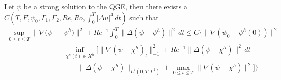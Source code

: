 \begin{thm} \label{thm:StrongConvergence}
  Let $\psi$ be a strong solution to the QGE, then there exists a \\ $C(T, F,
  \psi_0, \Gamma_1, \Gamma_2, Re, Ro,\int_0^T\! |\Delta u|^4\, dt)$ such that
  \begin{equation}
    \begin{split}
      \sup_{0\le t \le T} \|\nabla (\psi &- \psi^h) \|^2 + Re^{-1}
        \int_{0}^{T}\! \|\Delta (\psi - \psi^h)\|^2 \, dt \le C\biggl\{
          \|\nabla(\psi_0 - \psi^h(0))\|^2 \\
        & + \inf_{\chi^h(t) \in X^h} \biggl[\|\nabla(\psi - \chi^h)_t\|^2_{-1} +
          Re^{-1} \|\Delta(\psi - \chi^h)\|^2\, dt \\
        & \qquad + \|\Delta(\psi - \chi^h)\|_{L^4(0,T;L^2)} + \max_{0 \le t \le T}
          \|\nabla (\psi - \chi^h)\|^2\biggr] \biggr\}
    \end{split}
    \label{eqn:StrongConvergence}
  \end{equation}

\end{thm}
